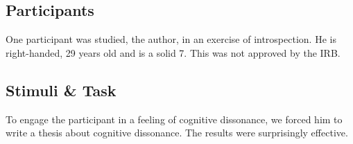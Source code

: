
\subsection{Participants}
One participant was studied, the author, in an exercise of introspection. He is right-handed, 29 years old and is a solid 7. This was not approved by the IRB.

\subsection{Stimuli {\&} Task}
To engage the participant in a feeling of cognitive dissonance, we forced him to write a thesis about cognitive dissonance. The results were surprisingly effective.
